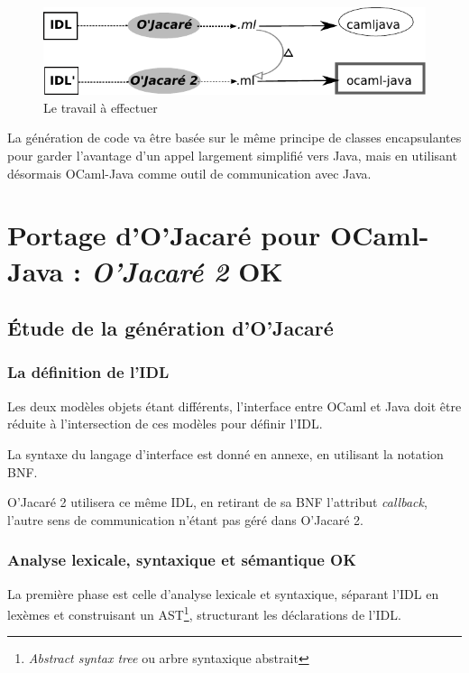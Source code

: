 \documentclass[a4paper, 11pt]{article}
\begin{document}
\begin{figure}[h]
  \centering
  \includegraphics{schema1.pdf}
  \caption{Le travail à effectuer}
\end{figure}

La génération de code va être basée sur le même principe de classes encapsulantes pour garder l'avantage d'un appel largement simplifié vers Java, mais en utilisant désormais OCaml-Java comme outil de communication avec Java.





\newpage
\section{Portage d'O'Jacaré pour OCaml-Java : \emph{O'Jacaré 2} OK}


\subsection{\'Etude de la génération d'O'Jacaré}\label{2.1}
\subsubsection{La définition de l'IDL}
Les deux modèles objets étant différents, l'interface entre OCaml et Java doit être réduite à l'intersection de ces modèles pour définir l'IDL.

La syntaxe du langage d'interface est donné en annexe, en utilisant la
notation BNF.

O'Jacaré 2 utilisera ce même IDL, en retirant de sa BNF l'attribut \emph{callback}, l'autre sens de communication n'étant pas géré dans O'Jacaré 2.

\subsubsection{Analyse lexicale, syntaxique et sémantique OK}
La première phase est celle d'analyse lexicale et syntaxique,
séparant l'IDL en lexèmes et construisant un AST\footnote{\emph{Abstract syntax tree} ou arbre syntaxique abstrait}, structurant les déclarations de l'IDL.
\end{document}

